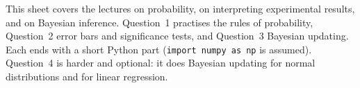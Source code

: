 \documentclass{sotonExamBoxes}    %
\begin{document}

\maketitle

This sheet covers the lectures on probability, on interpreting
experimental results, and on Bayesian inference.  Question~1 practises
the rules of probability, Question~2 error bars and significance tests,
and Question~3 Bayesian updating.  Each ends with a short Python part
(\texttt{import numpy as np} is assumed).  Question~4 is harder and
optional: it does Bayesian updating for normal distributions and for
linear regression.

\end{document}
